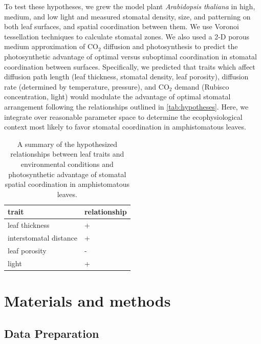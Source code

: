 \documentclass[webpdf,large,modern,unnumsec,namedate]{oup-authoring-template}
\begin{document}
To test these hypotheses, we grew the model plant \emph{Arabidopsis
thaliana} in high, medium, and low light and measured stomatal density,
size, and patterning on both leaf surfaces, and spatial coordination
between them. We use Voronoi tessellation techniques to calculate
stomatal zones. We also used a 2-D porous medium approximation of
CO\(_2\) diffusion and photosynthesis to predict the photosynthetic
advantage of optimal versus suboptimal coordination in stomatal
coordination between surfaces. Specifically, we predicted that traits
which affect diffusion path length (leaf thickness, stomatal density,
leaf porosity), diffusion rate (determined by temperature, pressure),
and CO\(_2\) demand (Rubisco concentration, light) would modulate the
advantage of optimal stomatal arrangement following the relationships
outlined in \autoref{tab:hypotheses}. Here, we integrate over reasonable
parameter space to determine the ecophysiological context most likely to
favor stomatal coordination in amphistomatous leaves.

\begin{table}[ht]
\centering
\begin{tabular}{ll}
  \hline
trait & relationship \\ 
  \hline
leaf thickness & + \\ 
  interstomatal distance & + \\ 
  leaf porosity & - \\ 
  light & + \\ 
   \hline
\end{tabular}
\caption{A summary of the hypothesized relationships between leaf traits and environmental conditions and photosynthetic advantage of stomatal spatial coordination in amphistomatous leaves.} 
\label{tab:hypotheses}
\end{table}

\section{Materials and methods}\label{materials-and-methods}

\subsection{Data Preparation}\label{data-preparation}
\end{document}
